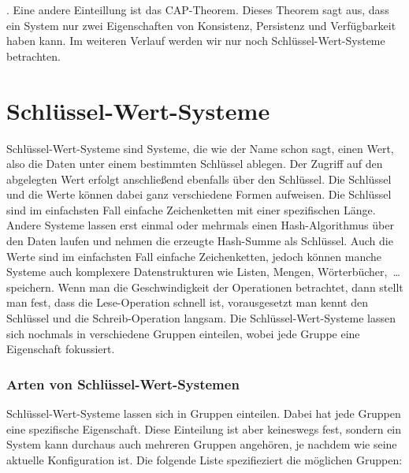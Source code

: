 . Eine andere Einteillung ist das \gls{CAP}-Theorem. Dieses Theorem sagt aus,
dass ein System nur zwei Eigenschaften von Konsistenz, Persistenz und
Verfügbarkeit haben kann.  Im weiteren Verlauf werden wir nur noch
Schlüssel-Wert-Systeme betrachten.

\section{Schlüssel-Wert-Systeme}
Schlüssel-Wert-Systeme sind Systeme, die wie der Name schon sagt, einen Wert,
also die Daten unter einem bestimmten Schlüssel ablegen. Der Zugriff auf den
abgelegten Wert erfolgt anschließend ebenfalls über den Schlüssel. Die Schlüssel
und die Werte können dabei ganz verschiedene Formen aufweisen. Die Schlüssel
sind im einfachsten Fall einfache Zeichenketten mit einer spezifischen Länge.
Andere Systeme lassen erst einmal oder mehrmals einen Hash-Algorithmus über den
Daten laufen und nehmen die erzeugte Hash-Summe als Schlüssel. Auch die Werte
sind im einfachsten Fall einfache Zeichenketten, jedoch können manche Systeme
auch komplexere Datenstrukturen wie Listen, Mengen, Wörterbücher,~\dots{}
speichern. Wenn man die Geschwindigkeit der Operationen betrachtet, dann stellt
man fest, dass die Lese-Operation schnell ist, vorausgesetzt man kennt den
Schlüssel und die Schreib-Operation langsam. Die Schlüssel-Wert-Systeme lassen
sich nochmals in verschiedene Gruppen einteilen, wobei jede Gruppe eine
Eigenschaft fokussiert.

\subsubsection{Arten von Schlüssel-Wert-Systemen}
Schlüssel-Wert-Systeme lassen sich in Gruppen einteilen. Dabei hat jede Gruppen
eine spezifische Eigenschaft. Diese Einteilung ist aber keineswegs fest, sondern
ein System kann durchaus auch mehreren Gruppen angehören, je nachdem wie seine
aktuelle Konfiguration ist. Die folgende Liste spezifieziert die möglichen
Gruppen:

